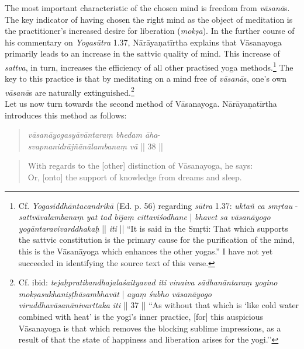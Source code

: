 The most important characteristic of the chosen mind is freedom from \textit{vāsanā}s. The key indicator of having chosen the right mind as the object of meditation is the practitioner's increased desire for liberation (\textit{mokṣa}). In the further course of his commentary on \emph{Yogasūtra} 1.37, Nārāyaṇatīrtha explains that Vāsanayoga primarily leads to an increase in the sattvic quality of mind. This increase of \emph{sattva}, in turn, increases the efficiency of all other practised yoga methods.\footnote{Cf. \textit{Yogasiddhāntacandrikā} (Ed. p. 56) regarding \textit{sūtra} 1.37: \textit{uktañ ca smṛtau} - \textit{sattvāvalambanaṃ yat tad bījaṃ cittaviśodhane} | \textit{bhavet sa vāsanāyogo yogāntaravivarddhakaḥ} || \textit{iti} || ``It is said in the Smṛti: That which supports the sattvic constitution is the primary cause for the purification of the mind, this is the Vāsanāyoga which enhances the other yogas.'' I have not yet succeeded in identifying the source text of this verse.} The key to this practice is that by meditating on a mind free of \textit{vāsanā}s, one's own \textit{vāsanā}s are naturally extinguished.\footnote{Cf. ibid: \textit{tejaḥpratibandhajalaśaityavad iti vinaiva sādhanāntaraṃ yogino mokṣasukhaniṣṭhāsambhavāt} | \textit{ayaṃ śubho vāsanāyogo viruddhavāsanānivarttaka iti} || 37 || ``As without that which is `like cold water combined with heat’ is the yogi's inner practice, [for] this auspicious Vāsanayoga is that which removes the blocking sublime impressions, as a result of that the state of happiness and liberation arises for the yogi.''}\\

Let us now turn towards the second method of Vāsanayoga. Nārāyaṇatīrtha introduces this method as follows:
\begin{quote}
\textit{vāsanāyogasyāvāntaraṃ bhedam āha}-\\
\textit{svapnanidrājñānālambanaṃ vā} || 38 ||
\end{quote}
\begin{quote}
With regards to the [other] distinction of Vāsanayoga, he says:\\ 
Or, [onto] the support of knowledge from dreams and sleep. 
\end{quote}


